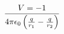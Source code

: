 \documentclass[preview]{standalone}
\begin{document}
\begin{align*}
V  =  - {1} \over {4 \pi\epsilon_0}  \left( \frac{q}{r_1} - \frac{q}{r_2} \right)
\end{align*}
\end{document}
